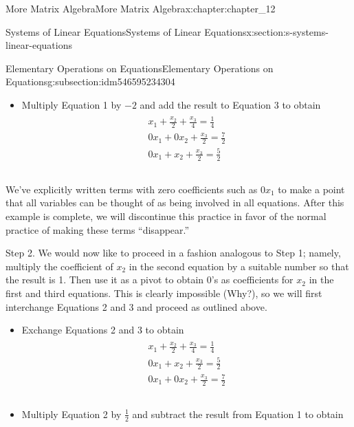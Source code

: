 \documentclass[oneside,10pt,]{book}
\numberwithin{equation}{section}
\begin{document}
\begin{chapterptx}{More Matrix Algebra}{}{More Matrix Algebra}{}{}{x:chapter:chapter_12}
\begin{sectionptx}{Systems of Linear Equations}{}{Systems of Linear Equations}{}{}{x:section:s-systems-linear-equations}
\begin{subsectionptx}{Elementary Operations on Equations}{}{Elementary Operations on Equations}{}{}{g:subsection:idm546595234304}
\begin{itemize}[label=\textbullet]
\begin{gather}
\begin{array}{c}
0 x_1 + 0 x_2+ \frac{x_3}{2}=\frac{7}{2} \\
2 x_1+2 x_2+x_3=3 \\\\
\end{array}\label{g:mrow:idm546595221040}
\end{gather}
%
\item{}Multiply Equation 1 by \(-2\) and  add the result to Equation 3 to obtain%
\begin{gather}
\begin{array}{c}
x_1+\frac{x_2}{2}+\frac{x_3}{4}=\frac{1}{4} \\
0 x_1 + 0 x_2+ \frac{x_3}{2}=\frac{7}{2} \\
0 x_1+ x_2+ \frac{x_3}{2}=\frac{5}{2} \\\\
\end{array}\label{g:mrow:idm546595219440}
\end{gather}
%
\end{itemize}
%
\par
We've explicitly written terms with zero coefficients such as \(0 x_1\) to make a point that all variables can be thought of as being involved in all equations.  After this example is complete, we will discontinue this practice in favor of the normal practice of making these terms ``disappear.''%
\par
Step 2. We would now like to proceed in a fashion analogous to Step 1; namely, multiply the coefficient of \(x_2\) in the second equation by a suitable number so that the result is 1. Then use it as a pivot to obtain 0's as coefficients for \(x_2\) in the first and third equations. This is clearly impossible (Why?), so we will first interchange Equations 2 and 3 and proceed as outlined above.%
\begin{itemize}[label=\textbullet]
\item{}Exchange Equations 2 and 3 to obtain%
\begin{gather}
\begin{array}{c}
x_1+\frac{x_2}{2}+\frac{x_3}{4}=\frac{1}{4} \\
0 x_1+  x_2+ \frac{x_3}{2}=\frac{5}{2} \\
0 x_1 + 0 x_2+ \frac{x_3}{2}=\frac{7}{2} \\\\
\end{array}\label{g:mrow:idm546595215536}
\end{gather}
%
\item{}Multiply Equation 2 by \(\frac{1}{2}\) and subtract the result from Equation 1 to obtain%

\end{itemize}
\end{subsectionptx}
\end{sectionptx}
\end{chapterptx}
\end{document}
